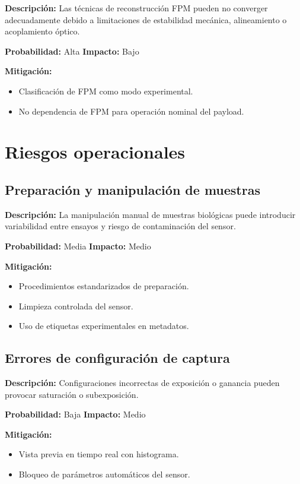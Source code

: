 \textbf{Descripción:}  
Las técnicas de reconstrucción FPM pueden no converger adecuadamente debido a
limitaciones de estabilidad mecánica, alineamiento o acoplamiento óptico.

\textbf{Probabilidad:} Alta  
\textbf{Impacto:} Bajo  

\textbf{Mitigación:}
\begin{itemize}
    \item Clasificación de FPM como modo experimental.
    \item No dependencia de FPM para operación nominal del payload.
\end{itemize}

\section{Riesgos operacionales}

\subsection{Preparación y manipulación de muestras}

\textbf{Descripción:}  
La manipulación manual de muestras biológicas puede introducir variabilidad entre
ensayos y riesgo de contaminación del sensor.

\textbf{Probabilidad:} Media  
\textbf{Impacto:} Medio  

\textbf{Mitigación:}
\begin{itemize}
    \item Procedimientos estandarizados de preparación.
    \item Limpieza controlada del sensor.
    \item Uso de etiquetas experimentales en metadatos.
\end{itemize}

\subsection{Errores de configuración de captura}

\textbf{Descripción:}  
Configuraciones incorrectas de exposición o ganancia pueden provocar saturación o
subexposición.

\textbf{Probabilidad:} Baja  
\textbf{Impacto:} Medio  

\textbf{Mitigación:}
\begin{itemize}
    \item Vista previa en tiempo real con histograma.
    \item Bloqueo de parámetros automáticos del sensor.
\end{itemize}

